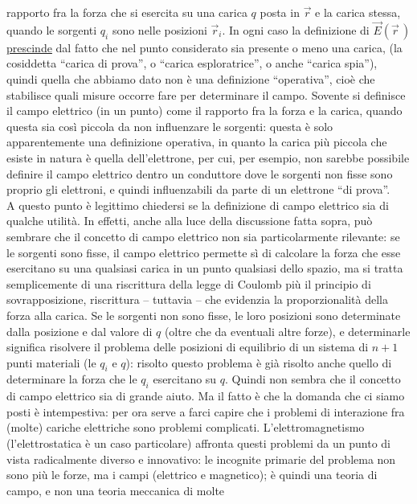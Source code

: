 rapporto fra la forza che si esercita su una carica $q$ posta in $\vec r$ e la
carica stessa, quando le sorgenti $q_i$ sono nelle posizioni $\vec r_i$. In ogni
caso la definizione di $\vec E(\vec r\,)$ \underline{prescinde} dal fatto che
nel punto considerato sia presente o meno una carica, (la cosiddetta ``carica di
prova'', o ``carica esploratrice'', o anche ``carica spia''), quindi quella che
abbiamo dato non \`e una definizione ``operativa'', cio\`e che stabilisce quali
misure occorre fare per determinare il campo. Sovente si definisce il campo
elettrico (in un punto) come il rapporto fra la forza e la carica, quando questa
sia cos\`i piccola da non influenzare le sorgenti: questa \`e solo
apparentemente una definizione operativa, in quanto la carica pi\`u piccola che
esiste in natura \`e quella dell'elettrone, per cui, per esempio, non sarebbe
possibile definire il campo elettrico dentro un conduttore dove le sorgenti non
fisse sono proprio gli elettroni, e quindi influenzabili da parte di un
elettrone ``di prova''.\\
A questo punto \`e legittimo chiedersi se la definizione di campo elettrico sia
di qualche utilit\`a. In effetti, anche alla luce della discussione fatta sopra,
pu\`o sembrare che il concetto di campo elettrico non sia particolarmente
rilevante: se le sorgenti sono fisse, il campo elettrico permette s\`i di
calcolare la forza che esse esercitano su una qualsiasi carica in un punto
qualsiasi dello spazio, ma si tratta semplicemente di una riscrittura della
legge di Coulomb pi\`u il principio di sovrapposizione, riscrittura -- tuttavia
-- che evidenzia la proporzionalit\`a della forza alla carica. Se le sorgenti
non sono fisse, le loro posizioni sono determinate dalla posizione e dal valore
di $q$ (oltre che da eventuali altre forze), e determinarle significa risolvere
il problema delle posizioni di equilibrio di un sistema di $n+1$ punti materiali
(le $q_i$ e $q$): risolto questo problema \`e gi\`a risolto anche quello di
determinare la forza che le $q_i$ esercitano su $q$. Quindi non sembra che il
concetto di campo elettrico sia di grande aiuto. Ma il fatto \`e che la domanda
che ci siamo posti \`e intempestiva: per ora serve a farci capire che i problemi
di interazione fra (molte) cariche elettriche sono problemi complicati.
L'elettromagnetismo (l'elettrostatica \`e un caso particolare) affronta questi
problemi da un punto di vista radicalmente diverso e innovativo: le incognite
primarie del problema non sono pi\`u le forze, ma i campi (elettrico e
magnetico); \`e quindi una teoria di campo, e non una teoria meccanica di molte
